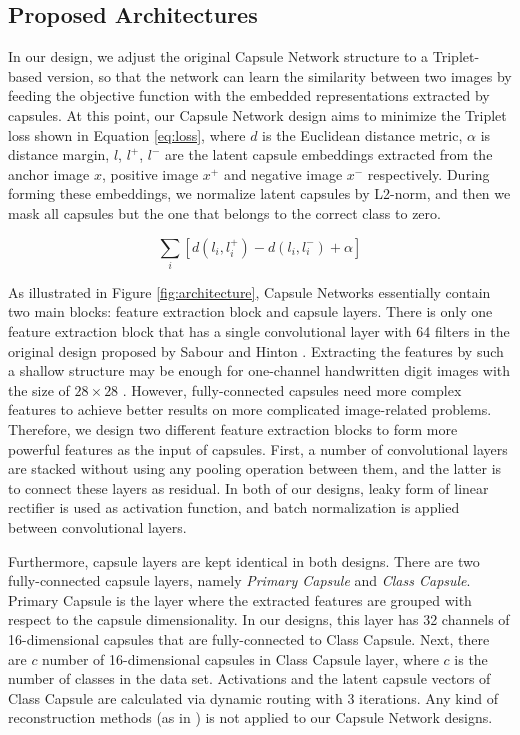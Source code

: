 \documentclass[10pt,twocolumn,letterpaper]{article}
\begin{document}
\subsection{Proposed Architectures}

In our design, we adjust the original Capsule Network structure to a Triplet-based version, so that the network can learn the similarity between two images by feeding the objective function with the embedded representations extracted by capsules. At this point, our Capsule Network design aims to minimize the Triplet loss shown in Equation \ref{eq:loss}, where $d$ is the Euclidean distance metric, $\alpha$ is distance margin, $l$, $l^{+}$, $l^{-}$ are the latent capsule embeddings extracted from the anchor image $x$, positive image $x^{+}$ and negative image $x^{-}$ respectively. During forming these embeddings, we normalize latent capsules by L2-norm, and then we mask all capsules but the one that belongs to the correct class to zero.

\begin{equation}
\sum_{i}  [d(l_{i}, l_{i}^{+}) - d(l_{i}, l_{i}^{-}) + \alpha]
\label{eq:loss}
\end{equation}

As illustrated in Figure \ref{fig:architecture}, Capsule Networks essentially contain two main blocks: feature extraction block and capsule layers. There is only one feature extraction block that has a single convolutional layer with 64 filters in the original design proposed by Sabour and Hinton \etal \cite{capsule}. Extracting the features by such a shallow structure may be enough for one-channel handwritten digit images with the size of $28 \times 28$ \cite{capsule}. However, fully-connected capsules need more complex features to achieve better results on more complicated image-related problems. Therefore, we design two different feature extraction blocks to form more powerful features as the input of capsules. First, a number of convolutional layers are stacked without using any pooling operation between them, and the latter is to connect these layers as residual. In both of our designs, leaky form of linear rectifier \cite{leaky-relu} is used as activation function, and batch normalization \cite{bn} is applied between convolutional layers.

Furthermore, capsule layers are kept identical in both designs. There are two fully-connected capsule layers, namely \textit{Primary Capsule} and \textit{Class Capsule}. Primary Capsule is the layer where the extracted features are grouped with respect to the capsule dimensionality. In our designs, this layer has 32 channels of 16-dimensional capsules that are fully-connected to Class Capsule. Next, there are $c$ number of 16-dimensional capsules in Class Capsule layer, where $c$ is the number of classes in the data set. Activations and the latent capsule vectors of Class Capsule are calculated via dynamic routing with 3 iterations. Any kind of reconstruction methods (\eg as in \cite{capsule}) is not applied to our Capsule Network designs.
\end{document}
